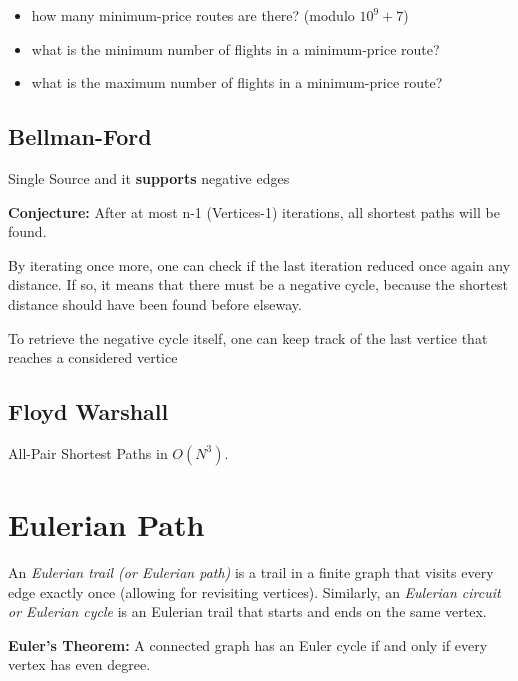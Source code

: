 		\begin{itemize}
			\item how many minimum-price routes are there? (modulo $10^9+7$)
			\item what is the minimum number of flights in a minimum-price route?
			\item what is the maximum number of flights in a minimum-price route?
		\end{itemize}


	\subsection{Bellman-Ford}

		Single Source and it \textbf{supports} negative edges

		\textbf{Conjecture:} After at most n-1 (Vertices-1) iterations, all shortest paths will be found.
		

		By iterating once more, one can check if the last iteration reduced once again any distance. If so, it means that
		there must be a negative cycle, because the shortest distance should have been found before elseway.
		
		To retrieve the negative cycle itself, one can keep track of the last vertice that reaches a considered vertice


	\subsection{Floyd Warshall}

	All-Pair Shortest Paths in $O(N^3)$.


\section{Eulerian Path}

	An \textit{Eulerian trail (or Eulerian path)} is a trail in a finite graph that visits every edge exactly once 
	(allowing for revisiting vertices). Similarly, an \textit{Eulerian circuit or Eulerian cycle} is an Eulerian trail 
	that starts and ends on the same vertex. 

	\textbf{Euler's Theorem:} A connected graph has an Euler cycle if and only if every vertex has even degree.

